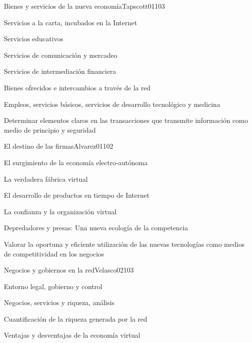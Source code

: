 \begin{syllabus}
\begin{unit}{Bienes y servicios de la nueva economía}{Tapscott01}{10}{3}
   \begin{topics}
      \item Servicios a la carta, incubados en la Internet
	\item Servicios educativos
	\item Servicios de comunicación y mercadeo
	\item Servicios de intermediación financiera
	\item Bienes ofrecidos e intercambios a través de la red
	\item Empleos, servicios básicos, servicios de desarrollo tecnológico y medicina
   \end{topics}

   \begin{learningoutcomes}
      \item Determinar elementos claros en las transacciones que transmite información como medio de principio y seguridad
   \end{learningoutcomes}
\end{unit}

\begin{unit}{El destino de las firmas}{Alvarez01}{10}{2}
   \begin{topics}
      \item El surgimiento de la economía electro-autónoma
	\item La verdadera fábrica virtual
	\item El desarrollo de productos en tiempo de Internet
	\item La confianza y la organización virtual
	\item Depredadores y presas: Una nueva ecología de la competencia
   \end{topics}

   \begin{learningoutcomes}
      \item Valorar la oportuna y eficiente utilización de las nuevas tecnologías como medios de competitividad en los negocios
   \end{learningoutcomes}
\end{unit}

\begin{unit}{Negocios y gobiernos en la red}{Velasco02}{10}{3}
   \begin{topics}
      \item Entorno legal, gobierno y control
	\item Negocios, servicios y riqueza, análisis
	\item Cuantificación de la riqueza generada por la red
	\item Ventajas y desventajas de la economía virtual
   \end{topics}


\end{unit}
\end{syllabus}
